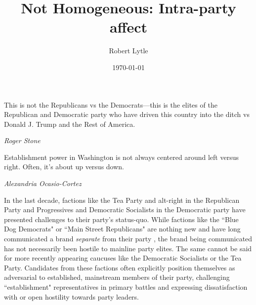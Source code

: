 \documentclass[12pt]{paper}
\begin{document}
\title{Not Homogeneous: Intra-party affect}
\author{Robert Lytle}
\date{\today}
\maketitle
\epigraph{This is not the Republicans vs the Democrats---this is the elites of the Republican and Democratic party who have driven this country into the ditch vs Donald J. Trump and the Rest of America.}{\textit{Roger Stone %
}}
\epigraph{Establishment power in Washington is not always centered around left versus right. Often, it’s about up versus down.}{\textit{Alexandria Ocasio-Cortez}}



In the last decade, factions like the Tea Party and alt-right in the Republican Party and Progressives and Democratic Socialists in the Democratic party have presented challenges to their party's status-quo. While factions like the ``Blue Dog Democrats" or ``Main Street Republicans" are nothing new and have long communicated a brand \textit{separate} from their party \citep{clarke2017party}, the brand being communicated has not necessarily been hostile to mainline party elites. The same cannot be said for more recently appearing caucuses like the Democratic Socialists or the Tea Party. Candidates from these factions often explicitly position themselves as adversarial to established, mainstream members of their party, challenging ``establishment" representatives in primary battles and expressing dissatisfaction with or open hostility towards party leaders.
\end{document}
